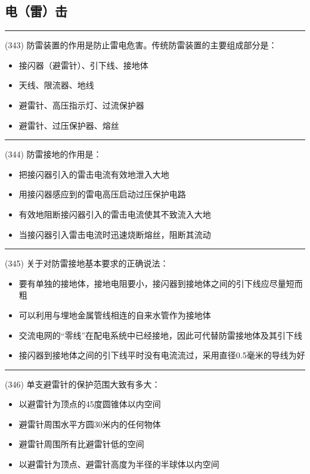\documentclass[twocolumn,hyperref,UTF8]{ctexart}  %
\begin{document}
\clearpage
\subsection{电（雷）击}


\noindent\rule{0.5\textwidth}{1pt}
\heiti (343) 防雷装置的作用是防止雷电危害。传统防雷装置的主要组成部分是： \songti {\color{gray} [LK0996] }
\begin{itemize}
	\item  接闪器（避雷针）、引下线、接地体
	\item  天线、限流器、地线
	\item  避雷针、高压指示灯、过流保护器
	\item  避雷针、过压保护器、熔丝
\end{itemize}


\noindent\rule{0.5\textwidth}{1pt}
\heiti (344) 防雷接地的作用是： \songti {\color{gray} [LK0997] }
\begin{itemize}
	\item  把接闪器引入的雷击电流有效地泄入大地
	\item  用接闪器感应到的雷电高压启动过压保护电路
	\item  有效地阻断接闪器引入的雷击电流使其不致流入大地
	\item  当接闪器引入雷击电流时迅速烧断熔丝，阻断其流动
\end{itemize}


\noindent\rule{0.5\textwidth}{1pt}
\heiti (345) 关于对防雷接地基本要求的正确说法： \songti {\color{gray} [LK0998] }
\begin{itemize}
	\item  要有单独的接地体，接地电阻要小，接闪器到接地体之间的引下线应尽量短而粗
	\item  可以利用与埋地金属管线相连的自来水管作为接地体
	\item  交流电网的“零线”在配电系统中已经接地，因此可代替防雷接地体及其引下线
	\item  接闪器到接地体之间的引下线平时没有电流流过，采用直径0.5毫米的导线为好
\end{itemize}


\noindent\rule{0.5\textwidth}{1pt}
\heiti (346) 单支避雷针的保护范围大致有多大： \songti {\color{gray} [LK0999] }
\begin{itemize}
	\item  以避雷针为顶点的45度圆锥体以内空间
	\item  避雷针周围水平方圆30米内的任何物体
	\item  避雷针周围所有比避雷针低的空间
	\item  以避雷针为顶点、避雷针高度为半径的半球体以内空间
\end{itemize}
\end{document}

